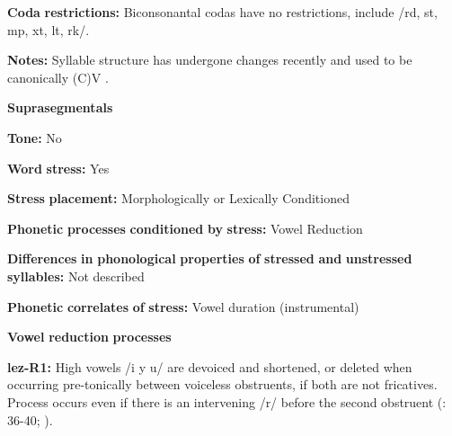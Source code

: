 \begin{styleBody}
\textbf{Coda} \textbf{restrictions:} Biconsonantal codas have no restrictions, include /rd, st, mp, xt, lt, rk/.
\end{styleBody}

\begin{styleBody}
\textbf{Notes:} Syllable structure has undergone changes recently and used to be canonically (C)V \citep[46]{Haspelmath1993}.
\end{styleBody}

\begin{styleBody}
\textbf{Suprasegmentals}
\end{styleBody}

\begin{styleBody}
\textbf{Tone:} No
\end{styleBody}

\begin{styleBody}
\textbf{Word} \textbf{stress:} Yes
\end{styleBody}

\begin{styleBody}
\textbf{Stress} \textbf{placement:} Morphologically or Lexically Conditioned
\end{styleBody}

\begin{styleBody}
\textbf{Phonetic} \textbf{processes} \textbf{conditioned} \textbf{by} \textbf{stress:} Vowel Reduction
\end{styleBody}

\begin{styleBody}
\textbf{Differences} \textbf{in} \textbf{phonological} \textbf{properties} \textbf{of} \textbf{stressed} \textbf{and} \textbf{unstressed} \textbf{syllables:} Not described
\end{styleBody}

\begin{styleBody}
\textbf{Phonetic} \textbf{correlates} \textbf{of} \textbf{stress:} Vowel duration (instrumental)
\end{styleBody}

\begin{styleBody}
\textbf{Vowel} \textbf{reduction} \textbf{processes}
\end{styleBody}

\begin{styleBody}
\textbf{lez-R1:} High vowels /i y u/ are devoiced and shortened, or deleted when occurring pre-tonically between voiceless obstruents, if both are not fricatives. Process occurs even if there is an intervening /r/ before the second obstruent (\citealt{Haspelmath1993}: 36-40; \citealt{ChitoranBabaliyeva2007}).
\end{styleBody}

